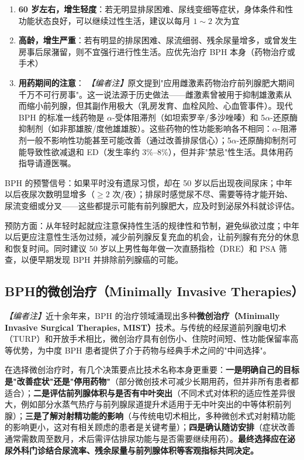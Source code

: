 \begin{enumerate}
	\item \textbf{60 岁左右，增生轻度}：若无明显排尿困难、尿线变细等症状，身体条件和性功能状态良好，可以继续过性生活，建议以每月 $1\sim2$ 次为宜

	\item \textbf{高龄，增生严重}：若有明显的排尿困难、尿流细弱、残余尿量增多，或曾发生房事后尿潴留，则不宜强行进行性生活。应优先治疗 BPH 本身（药物治疗或手术）

	\item \textbf{用药期间的注意}：
	\noindent\textit{【编者注】}原文提到"应用雌激素药物治疗前列腺肥大期间千万不可行房事"。这一说法源于历史做法——雌激素曾被用于抑制雄激素从而缩小前列腺，但其副作用极大（乳房发育、血栓风险、心血管事件）。现代 BPH 的标准一线药物是 $\alpha$-受体阻滞剂（如坦索罗辛/多沙唑嗪）和 5$\alpha$-还原酶抑制剂（如非那雄胺/度他雄雄胺）。这些药物的性功能影响各不相同：$\alpha$-阻滞剂一般不影响性功能甚至可能改善（通过改善排尿信心）；5$\alpha$-还原酶抑制剂可能导致性欲减退和 ED（发生率约 3\%--8\%），但并非"禁忌"性生活。具体用药指导请遵医嘱。
\end{enumerate}

\begin{tcolorbox}[colback=pink!5!white,colframe=red!50~50!black,title=贴心小叮咛]
BPH 的预警信号：如果平时没有遗尿习惯，却在 50 岁以后出现夜间尿床；中年以后夜尿次数明显增多（$\geq2$ 次/夜）；排尿时感觉尿不尽、需要等待才能开始、尿流变细或分叉——这些都提示可能有前列腺肥大，应及时到泌尿外科就诊评估。

预防方面：从年轻时起就应注意保持性生活的规律性和节制，避免纵欲过度；中年以后更应注意性生活勿过频，减少前列腺反复充血的机会，让前列腺有充分的休息和恢复时间。同时建议 50 岁以上男性每年做一次直肠指检（DRE）和 PSA 筛查，以便早期发现 BPH 并排除前列腺癌的可能。
\end{tcolorbox}

\subsection{BPH的微创治疗（Minimally Invasive Therapies）}
\label{subsec:bph_minitreatment}

\noindent\textit{【编者注】}近十余年来，BPH 的治疗领域涌现出多种\textbf{微创治疗（Minimally Invasive Surgical Therapies, MIST）}技术。与传统的经尿道前列腺电切术（TURP）和开放手术相比，微创治疗具有创伤小、住院时间短、性功能保留率高等优势，为中度 BPH 患者提供了介于药物与经典手术之间的"中间选择"。


在选择微创治疗时，有几个决策要点比技术名称本身更重要：\textbf{一是明确自己的目标是"改善症状"还是"停用药物"}（部分微创技术可减少长期用药，但并非所有患者都适合）；\textbf{二是评估前列腺体积与是否有中叶突出}（不同术式对体积的适应性差异很大，例如部分水蒸气热疗与前列腺尿道提升术适用于无中叶突出的中等体积前列腺）；\textbf{三是了解对射精功能的影响}（与传统电切术相比，多种微创术式对射精功能的影响更小，这对有相关顾虑的患者是关键考量）；\textbf{四是确认随访安排}（症状改善通常需数周至数月，术后需评估排尿功能与是否需要继续用药）。\textbf{最终选择应在泌尿外科门诊结合尿流率、残余尿量与前列腺体积等客观指标共同决定。}

